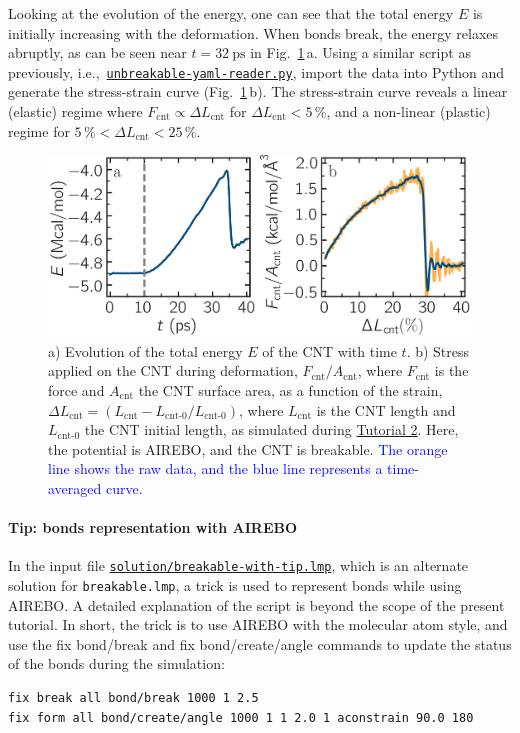 \documentclass[9pt,tutorial]{livecoms}
\newcommand{\lmpcmd}[1]{\colorbox{listing}{\textcolor{command}{\small{#1}}}} %
\newcommand{\flecmd}[1]{\textcolor{command}{\texttt{#1}}} %
\newcommand{\dwlcmd}[1]{\textcolor{download}{\texttt{#1}}} %
\newcommand{\filepath}{https://raw.githubusercontent.com/lammpstutorials/lammpstutorials-article/main/files/}
\begin{document}
Looking at the evolution of the energy, one can see that the total
energy $E$ is initially increasing with the deformation.  When bonds
break, the energy relaxes abruptly, as can be seen near $t=32~\text{ps}$
in Fig.~\ref{fig:CNT-breakable-energy-stress}\,a.  Using a similar
script as previously,
i.e.,~\href{\filepath tutorial2/unbreakable-yaml-reader.py}{\dwlcmd{unbreakable-yaml-reader.py}},
import the data into Python and generate the stress-strain curve
(Fig.~\ref{fig:CNT-breakable-energy-stress}\,b).  The stress-strain
curve reveals a linear (elastic) regime where
$F_\text{cnt} \propto \Delta L_\text{cnt}$ for
$\Delta L_\text{cnt} < 5\,\%$, and a non-linear (plastic) regime for
$5\,\% < \Delta L_\text{cnt} < 25\,\%$.

\begin{figure}
\centering
\includegraphics[width=\linewidth]{CNT-breakable-stress-energy}
\caption{a) Evolution of the total energy $E$ of the CNT with time $t$.
b) Stress applied on the CNT during deformation, $F_\text{cnt}/A_\text{cnt}$,
where $F_\text{cnt}$ is the force and $A_\text{cnt}$ the CNT surface area,
as a function of the strain, $\Delta L_\text{cnt} = (L_\text{cnt}-L_\text{cnt-0}/L_\text{cnt-0})$, where
$L_\text{cnt}$ is the CNT length and $L_\text{cnt-0}$ the CNT initial length,
as simulated during \hyperref[carbon-nanotube-label]{Tutorial 2}.
Here, the potential is AIREBO, and the CNT is breakable.  \textcolor{blue}{The orange line
shows the raw data, and the blue line represents a time-averaged curve.}}
\label{fig:CNT-breakable-energy-stress}
\end{figure}

\paragraph{Tip: bonds representation with AIREBO}
\label{tip-dynamic-bonds}

In the input file
\href{\filepath tutorial2/solution/breakable-with-tip.lmp}{\dwlcmd{solution/breakable-with-tip.lmp}},
which is an alternate solution for \flecmd{breakable.lmp}, a trick is
used to represent bonds while using AIREBO.  A detailed explanation of
the script is beyond the scope of the present tutorial.  In short, the
trick is to use AIREBO with the \lmpcmd{molecular} atom style, and use
the \lmpcmd{fix bond/break} and \lmpcmd{fix bond/create/angle} commands
to update the status of the bonds during the simulation:
\begin{lstlisting}
fix break all bond/break 1000 1 2.5
fix form all bond/create/angle 1000 1 1 2.0 1 aconstrain 90.0 180
\end{lstlisting}
\end{document}
